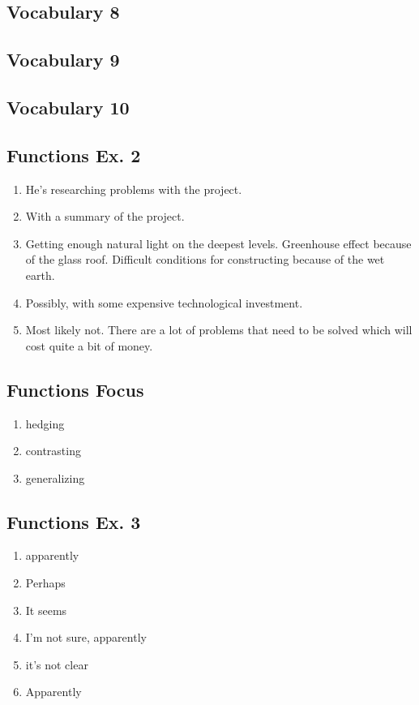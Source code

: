 \documentclass[12pt, a4paper, oneside]{article}
\begin{document}
  \subsection{Vocabulary 8}

  \subsection{Vocabulary 9}

  \subsection{Vocabulary 10}

  \subsection{Functions Ex. 2}
  \begin{enumerate}[1.]
    \item He's researching problems with the project.
    \item With a summary of the project.
    \item Getting enough natural light on the deepest levels. Greenhouse effect because of the glass roof. Difficult conditions for constructing because of the wet earth.
    \item Possibly, with some expensive technological investment.
    \item Most likely not. There are a lot of problems that need to be solved which will cost quite a bit of money.
  \end{enumerate}

  \subsection{Functions Focus}
  \begin{enumerate}[1.]
    \item hedging
    \item contrasting
    \item generalizing
  \end{enumerate}

  \subsection{Functions Ex. 3}
  \begin{enumerate}[1.]
    \item apparently
    \item Perhaps
    \item It seems
    \item I'm not sure, apparently
    \item it's not clear
    \item Apparently
  \end{enumerate}
\end{document}
